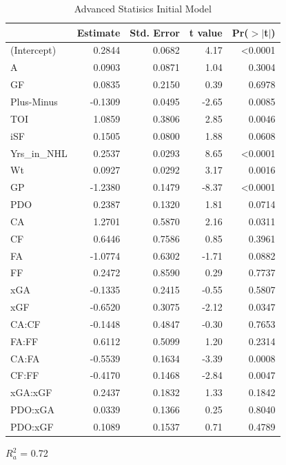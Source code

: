 \documentclass[10pt]{article}
\begin{document}
{{{{%
\begin{table}[tph]
\caption{Advanced Statisics Initial Model}
\label{tab:advanced}
\centering
\begin{threeparttable}
\begin{tabular}[t]{lrrrr}
  \toprule
  & Estimate & Std. Error & t value & Pr($>$$|$t$|$)\\
      \midrule
    (Intercept) & 0.2844 & 0.0682 & 4.17 & <0.0001 \\ 
    A & 0.0903 & 0.0871 & 1.04 & 0.3004 \\ 
    GF & 0.0835 & 0.2150 & 0.39 & 0.6978 \\ 
    Plus-Minus & -0.1309 & 0.0495 & -2.65 & 0.0085 \\ 
    TOI & 1.0859 & 0.3806 & 2.85 & 0.0046 \\ 
    iSF & 0.1505 & 0.0800 & 1.88 & 0.0608 \\ 
    Yrs\_in\_NHL & 0.2537 & 0.0293 & 8.65 & <0.0001 \\ 
    Wt & 0.0927 & 0.0292 & 3.17 & 0.0016 \\ 
    GP & -1.2380 & 0.1479 & -8.37 & <0.0001 \\ 
    PDO & 0.2387 & 0.1320 & 1.81 & 0.0714 \\ 
    CA & 1.2701 & 0.5870 & 2.16 & 0.0311 \\ 
    CF & 0.6446 & 0.7586 & 0.85 & 0.3961 \\
    FA & -1.0774 & 0.6302 & -1.71 & 0.0882 \\ 
    FF & 0.2472 & 0.8590 & 0.29 & 0.7737 \\ 
    xGA & -0.1335 & 0.2415 & -0.55 & 0.5807 \\ 
    xGF & -0.6520 & 0.3075 & -2.12 & 0.0347 \\ 
    CA:CF & -0.1448 & 0.4847 & -0.30 & 0.7653 \\ 
    FA:FF & 0.6112 & 0.5099 & 1.20 & 0.2314 \\ 
    CA:FA & -0.5539 & 0.1634 & -3.39 & 0.0008 \\ 
    CF:FF & -0.4170 & 0.1468 & -2.84 & 0.0047 \\ 
    xGA:xGF & 0.2437 & 0.1832 & 1.33 & 0.1842 \\ 
    PDO:xGA & 0.0339 & 0.1366 & 0.25 & 0.8040 \\ 
    PDO:xGF & 0.1089 & 0.1537 & 0.71 & 0.4789 \\ 
   \bottomrule
\end{tabular}
    \begin{tablenotes}
      \item $R^2_a$ = 0.72  %
    \end{tablenotes}
  \end{threeparttable}    
\end{table}

}}}}
\end{document}
